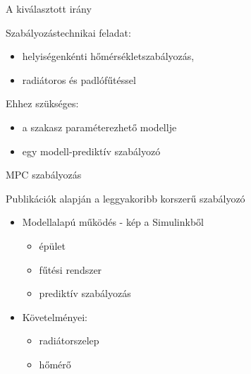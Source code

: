 \documentclass[14pt,handout]{beamer}
\begin{document}
\begin{frame}{A kiválasztott irány}

Szabályozástechnikai feladat:

\begin{itemize}
	\item helyiségenkénti hőmérsékletszabályozás,
	\item radiátoros és padlófűtéssel
\end{itemize}
\vspace{6pt}

Ehhez szükséges:


\begin{itemize}
	\item a szakasz paraméterezhető modellje
	\item egy modell-prediktív szabályozó
\end{itemize}


\end{frame}


\begin{frame}{MPC szabályozás}

Publikációk alapján a leggyakoribb korszerű szabályozó

\begin{itemize}
	\setlength{\itemsep}{12pt}
	\item Modellalapú működés - kép a Simulinkből
	\begin{itemize}
		\item épület
		\item fűtési rendszer
		\item prediktív szabályozás
	\end{itemize}
	\item Követelményei:
	\begin{itemize}
		\item radiátorszelep
		\item hőmérő
	\end{itemize}
\end{itemize}
\end{frame}
\end{document}
